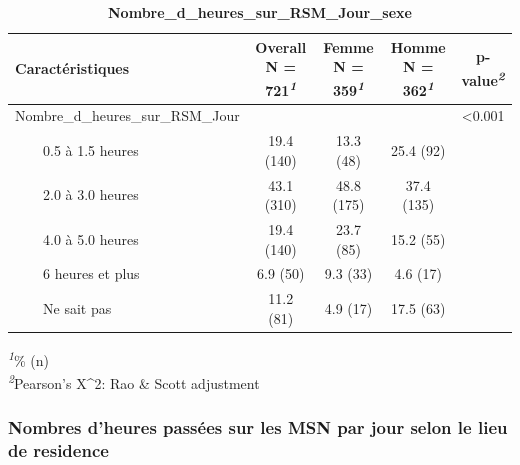 \documentclass[
]{article}
\begin{document}
\begin{table}[!t]
\caption{\label{tab:unnamed-chunk-52}\textbf{Nombre\_d\_heures\_sur\_RSM\_Jour\_sexe}} 
\fontsize{12.0pt}{14.4pt}\selectfont
\begin{tabular*}{\linewidth}{@{\extracolsep{\fill}}lcccc}
\toprule
\textbf{Caractéristiques} & \textbf{Overall}  N = 721\textsuperscript{\textit{1}} & \textbf{Femme}  N = 359\textsuperscript{\textit{1}} & \textbf{Homme}  N = 362\textsuperscript{\textit{1}} & \textbf{p-value}\textsuperscript{\textit{2}} \\ 
\midrule\addlinespace[2.5pt]
Nombre\_d\_heures\_sur\_RSM\_Jour &  &  &  & <0.001 \\ 
    0.5 à 1.5 heures & 19.4 (140) & 13.3 (48) & 25.4 (92) &  \\ 
    2.0 à 3.0 heures & 43.1 (310) & 48.8 (175) & 37.4 (135) &  \\ 
    4.0 à 5.0 heures & 19.4 (140) & 23.7 (85) & 15.2 (55) &  \\ 
    6 heures et plus & 6.9 (50) & 9.3 (33) & 4.6 (17) &  \\ 
    Ne sait pas & 11.2 (81) & 4.9 (17) & 17.5 (63) &  \\ 
\bottomrule
\end{tabular*}
\begin{minipage}{\linewidth}
\textsuperscript{\textit{1}}\% (n)\\
\textsuperscript{\textit{2}}Pearson's X\^{}2: Rao \& Scott adjustment\\
\end{minipage}
\end{table}

\hypertarget{nombres-dheures-passuxe9es-sur-les-msn-par-jour-selon-le-lieu-de-residence}{%
\subsubsection{Nombres d'heures passées sur les MSN par jour selon le
lieu de
residence}\label{nombres-dheures-passuxe9es-sur-les-msn-par-jour-selon-le-lieu-de-residence}}
\end{document}
